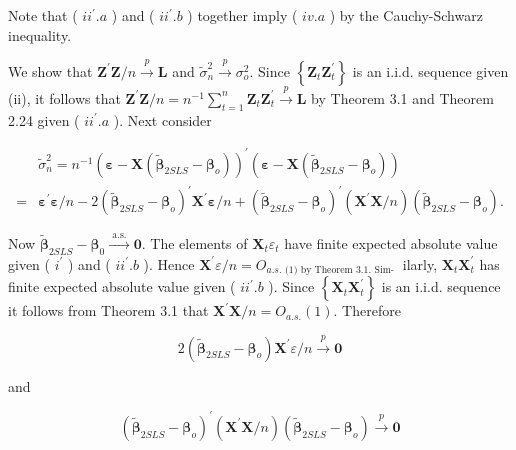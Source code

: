 \documentclass[10pt]{article}
\begin{document}
Note that ( $i i^{\prime} . a$ ) and ( $i i^{\prime} . b$ ) together imply ( $i v . a$ ) by the Cauchy-Schwarz inequality.

We show that $\mathbf{Z}^{\prime} \mathbf{Z} / n \xrightarrow{p} \mathbf{L}$ and $\tilde{\sigma}_{n}^{2} \xrightarrow{p} \sigma_{o}^{2}$. Since $\left\{\mathbf{Z}_{t} \mathbf{Z}_{t}^{\prime}\right\}$ is an i.i.d. sequence given (ii), it follows that $\mathbf{Z}^{\prime} \mathbf{Z} / n=n^{-1} \sum_{t=1}^{n} \mathbf{Z}_{t} \mathbf{Z}_{t}^{\prime} \xrightarrow{p} \mathbf{L}$ by Theorem 3.1 and Theorem 2.24 given ( $i i^{\prime} . a$ ). Next consider

$$
\begin{aligned}
& \tilde{\sigma}_{n}^{2}=n^{-1}\left(\boldsymbol{\varepsilon}-\mathbf{X}\left(\tilde{\boldsymbol{\beta}}_{2 S L S}-\boldsymbol{\beta}_{o}\right)\right)^{\prime}\left(\boldsymbol{\varepsilon}-\mathbf{X}\left(\tilde{\boldsymbol{\beta}}_{2 S L S}-\boldsymbol{\beta}_{o}\right)\right) \\
= & \boldsymbol{\varepsilon}^{\prime} \boldsymbol{\varepsilon} / n-2\left(\tilde{\boldsymbol{\beta}}_{2 S L S}-\boldsymbol{\beta}_{o}\right)^{\prime} \mathbf{X}^{\prime} \boldsymbol{\varepsilon} / n+\left(\tilde{\boldsymbol{\beta}}_{2 S L S}-\boldsymbol{\beta}_{o}\right)^{\prime}\left(\mathbf{X}^{\prime} \mathbf{X} / n\right)\left(\tilde{\boldsymbol{\beta}}_{2 S L S}-\boldsymbol{\beta}_{o}\right) .
\end{aligned}
$$

Now $\tilde{\boldsymbol{\beta}}_{2 S L S}-\boldsymbol{\beta}_{0} \xrightarrow{\text { a.s. }} \mathbf{0}$. The elements of $\mathbf{X}_{t} \varepsilon_{t}$ have finite expected absolute value given ( $i^{\prime}$ ) and ( $i i^{\prime} . b$ ). Hence $\mathbf{X}^{\prime} \varepsilon / n=O_{a . s \text {. (1) by Theorem 3.1. Sim- }}$ ilarly, $\mathbf{X}_{t} \mathbf{X}_{t}^{\prime}$ has finite expected absolute value given ( $i i^{\prime} . b$ ). Since $\left\{\mathbf{X}_{t} \mathbf{X}_{t}^{\prime}\right\}$ is an i.i.d. sequence it follows from Theorem 3.1 that $\mathbf{X}^{\prime} \mathbf{X} / n=O_{a . s .}(1)$. Therefore

$$
2\left(\tilde{\boldsymbol{\beta}}_{2 S L S}-\boldsymbol{\beta}_{o}\right) \mathbf{X}^{\prime} \varepsilon / n \xrightarrow{p} \mathbf{0}
$$

and

$$
\left(\tilde{\boldsymbol{\beta}}_{2 S L S}-\boldsymbol{\beta}_{o}\right)^{\prime}\left(\mathbf{X}^{\prime} \mathbf{X} / n\right)\left(\tilde{\boldsymbol{\beta}}_{2 S L S}-\boldsymbol{\beta}_{o}\right) \xrightarrow{p} \mathbf{0}
$$
\end{document}
